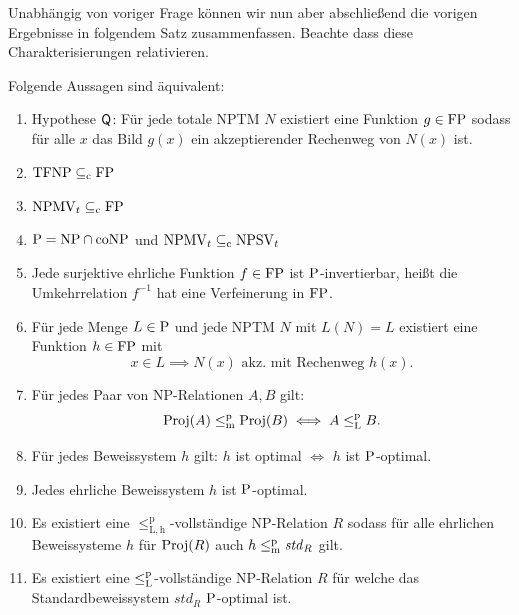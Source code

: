Unabhängig von voriger Frage können wir nun aber abschließend die vorigen Ergebnisse in folgendem Satz zusammenfassen.
Beachte dass diese Charakterisierungen relativieren.

\begin{theorem}\label{thm:q}
    Folgende Aussagen sind äquivalent:
    \begin{enumerate}[midpenalty=0]
        \item Hypothese $\hQ$: Für jede totale NPTM $N$  existiert eine Funktion $g\in\FP$ sodass für alle $x$ das Bild $g(x)$ ein akzeptierender Rechenweg von $N(x)$ ist.
        \item $\TFNP\subseteqc \FP$
        \item $\mathrm{NPMV}_t\subseteqc \FP$
        \item $\P=\NP\cap\coNP$ und $\mathrm{NPMV}_t\subseteqc \mathrm{NPSV}_t$
        \item Jede surjektive ehrliche Funktion $f\in\FP$ ist $\P$-invertierbar, heißt die Umkehrrelation $f^{-1}$ hat eine Verfeinerung in $\FP$. 
        \item Für jede Menge $L\in \P$  und jede NPTM $N$ mit $L(N)=L$ existiert eine Funktion $h\in \FP$ mit 
            \[ x\in L \implies N(x) \text{ akz. mit Rechenweg $h(x)$}. \]
        \item Für jedes Paar von NP-Relationen $A, B$ gilt:
            \[ \Proj(A) \leqmp \Proj(B) \iff A \leqlp B. \]
        \item Für jedes Beweissystem $h$ gilt: $h$ ist optimal $\iff$ $h$ ist $\P$-optimal. 
        \item Jedes ehrliche Beweissystem $h$ ist $\P$-optimal. 
        \item Es existiert eine $\leq_\mathrm{L,h}^\mathrm p$-vollständige NP-Relation $R$ sodass für alle ehrlichen Beweissysteme $h$ für $\Proj(R)$ auch $h\leqmp \mathit{std}_R$ gilt.
        \item Es existiert eine $\leqlp$-vollständige NP-Relation $R$ für welche das Standardbeweissystem $\mathit{std}_R$ $\P$-optimal ist.
    \end{enumerate}
\end{theorem}
